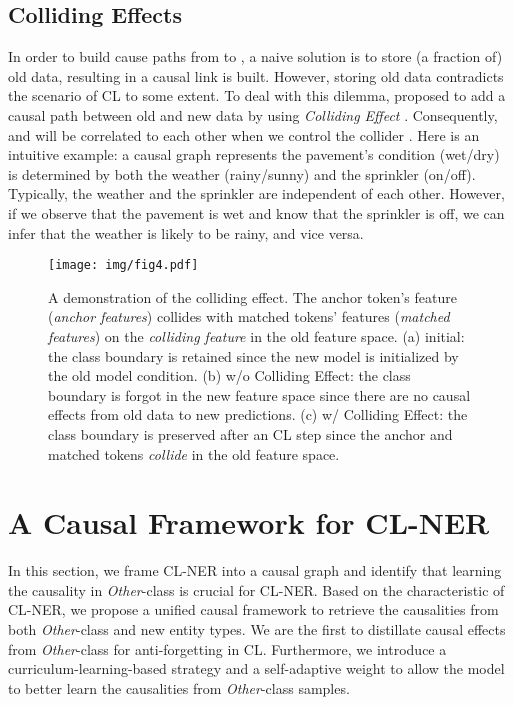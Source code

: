 \documentclass[11pt]{article}
\begin{document}
\subsection{Colliding Effects}
In order to build cause paths from  to , a naive solution is to store (a fraction of) old data, resulting in a causal link  is built.
However, storing old data contradicts the scenario of CL to some extent.
To deal with this dilemma, \citet{hu2021distilling} proposed to add a causal path   between old and new data by using \textit{Colliding Effect} \citep{glymour2016causal}. 
Consequently,  and  will be correlated to each other when we control the collider .
Here is an intuitive example: a causal graph  represents the pavement's condition (wet/dry) is determined by both the weather (rainy/sunny) and the sprinkler (on/off).
Typically, the weather and the sprinkler are independent of each other.
However, if we observe that the pavement is wet and know that the sprinkler is off, we can infer that the weather is likely to be rainy, and vice versa.

\begin{figure*}[t]
    \centering
    \texttt{[image: img/fig4.pdf]}
    \caption{A demonstration of the colliding effect. The anchor token's feature (\textit{anchor features}) collides with matched tokens' features (\textit{matched features}) on the \textit{colliding feature} in the old feature space. (a) initial: the class boundary is retained since the new model is initialized by the old model condition. (b) w/o Colliding Effect: the class boundary is forgot in the new feature space since there are no causal effects from old data to new predictions. (c) w/ Colliding Effect: the class boundary is preserved after an CL step since the anchor and matched tokens \textit{collide} in the old feature space.}
    \label{fig4}
\end{figure*}

\section{A Causal Framework for CL-NER}
In this section, we frame CL-NER into a causal graph and identify that learning the causality in \textit{Other}-class is crucial for CL-NER.
Based on the characteristic of CL-NER, we propose a unified causal framework to retrieve the causalities from both \textit{Other}-class and new entity types.
We are the first to distillate causal effects from \textit{Other}-class for anti-forgetting in CL.
Furthermore, we introduce a curriculum-learning-based strategy and a self-adaptive weight to allow the model to better learn the causalities from \textit{Other}-class samples.
\end{document}
